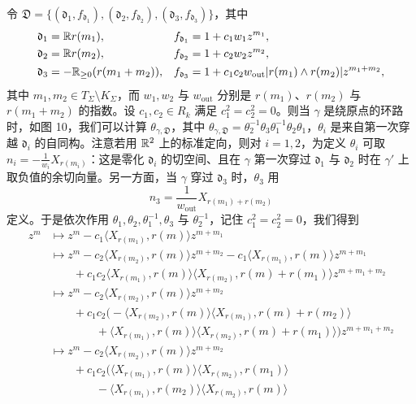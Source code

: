 \begin{example}
令 $\mathfrak D=\{(\mathfrak d_1,f_{\mathfrak d_1}),(\mathfrak d_2,f_{\mathfrak d_2}),(\mathfrak d_3,f_{\mathfrak d_3})\}$，其中
\[
  \begin{aligned}
    \mathfrak d_1&=\mathbb{R} r(m_1), & f_{\mathfrak d_1}&=1+c_1w_1z^{m_1},\\
    \mathfrak d_2&=\mathbb{R} r(m_2), & f_{\mathfrak d_2}&=1+c_2w_2z^{m_2},\\
    \mathfrak d_3&=-\mathbb{R}_{\ge0}(r(m_1+m_2)), & f_{\mathfrak d_3}&=1+c_1c_2w_{\mathrm{out}}|r(m_1)\wedge r(m_2)|z^{m_1+m_2},
  \end{aligned}
\]
其中 $m_1,m_2\in T_\Sigma\setminus K_\Sigma$，而 $w_1,w_2$ 与 $w_{\mathrm{out}}$ 分别是 $r(m_1)$、$r(m_2)$ 与 $r(m_1+m_2)$ 的指数。设 $c_1,c_2\in R_k$ 满足 $c_1^2=c_2^2=0$。则当 $\gamma$ 是绕原点的环路时，如图 10，我们可以计算 $\theta_{\gamma,\mathfrak D}$，其中 $\theta_{\gamma,\mathfrak D}=\theta_2^{-1}\theta_3\theta_1^{-1}\theta_2\theta_1$，$\theta_i$ 是来自第一次穿越 $\mathfrak d_i$ 的自同构。注意若用 $\mathbb{R}^2$ 上的标准定向，则对 $i=1,2$，为定义 $\theta_i$ 可取 $n_i=-\frac{1}{w_i}X_{r(m_i)}$：这是零化 $\mathfrak d_i$ 的切空间、且在 $\gamma$ 第一次穿过 $\mathfrak d_1$ 与 $\mathfrak d_2$ 时在 $\gamma'$ 上取负值的余切向量。另一方面，当 $\gamma$ 穿过 $\mathfrak d_3$ 时，$\theta_3$ 用
\[
  n_3=\frac{1}{w_{\mathrm{out}}}X_{r(m_1)+r(m_2)}
\]
定义。于是依次作用 $\theta_1,\theta_2,\theta_1^{-1},\theta_3$ 与 $\theta_2^{-1}$，记住 $c_1^2=c_2^2=0$，我们得到
\[
  \begin{aligned}
    z^m&\mapsto z^m-c_1\langle X_{r(m_1)},r(m)\rangle z^{m+m_1}\\
    &\mapsto z^m-c_2\langle X_{r(m_2)},r(m)\rangle z^{m+m_2}-c_1\langle X_{r(m_1)},r(m)\rangle z^{m+m_1}\\
    &\qquad+c_1c_2\langle X_{r(m_1)},r(m)\rangle\langle X_{r(m_2)},r(m)+r(m_1)\rangle z^{m+m_1+m_2}\\
    &\mapsto z^m-c_2\langle X_{r(m_2)},r(m)\rangle z^{m+m_2}\\
    &\qquad+c_1c_2\bigl(-\langle X_{r(m_2)},r(m)\rangle\langle X_{r(m_1)},r(m)+r(m_2)\rangle\\
    &\qquad\qquad+\langle X_{r(m_1)},r(m)\rangle\langle X_{r(m_2)},r(m)+r(m_1)\rangle\bigr)z^{m+m_1+m_2}\\
    &\mapsto z^m-c_2\langle X_{r(m_2)},r(m)\rangle z^{m+m_2}\\
    &\qquad+c_1c_2\bigl(\langle X_{r(m_1)},r(m)\rangle\langle X_{r(m_2)},r(m_1)\rangle\\
    &\qquad\qquad-\langle X_{r(m_1)},r(m_2)\rangle\langle X_{r(m_2)},r(m)\rangle\\

\end{aligned}\]
\end{example}
